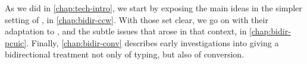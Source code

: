  

As we did in \cref{chap:tech-intro}, we start by exposing the main ideas in the
simpler setting of , in \cref{chap:bidir-ccw}.
With those set clear, we go on with their adaptation to , and the subtle
issues that arose in that context, in \cref{chap:bidir-pcuic}.
Finally, \cref{chap:bidir-conv} describes early investigations into giving a
bidirectional treatment not only of typing, but also of conversion.

